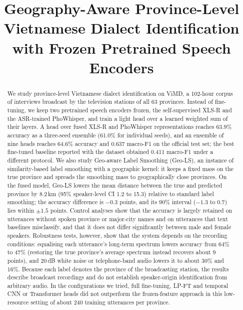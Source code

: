 \documentclass[conference]{IEEEtran}
\begin{document}
\title{Geography-Aware Province-Level Vietnamese Dialect Identification with Frozen Pretrained Speech Encoders}

\author{
}

\maketitle

\begin{abstract}
We study province-level Vietnamese dialect identification on ViMD, a 102-hour corpus of interviews broadcast by the television stations of all 63 provinces. Instead of fine-tuning, we keep two pretrained speech encoders frozen, the self-supervised XLS-R and the ASR-trained PhoWhisper, and train a light head over a learned weighted sum of their layers. A head over fused XLS-R and PhoWhisper representations reaches 63.9\% accuracy as a three-seed ensemble (61.0\% for individual seeds), and an ensemble of nine heads reaches 64.6\% accuracy and 0.637 macro-F1 on the official test set; the best fine-tuned baseline reported with the dataset obtained 0.411 macro-F1 under a different protocol. We also study Geo-aware Label Smoothing (Geo-LS), an instance of similarity-based label smoothing with a geographic kernel: it keeps a fixed mass on the true province and spreads the smoothing mass to geographically close provinces. On the fused model, Geo-LS lowers the mean distance between the true and predicted province by 8.2\,km (95\% speaker-level CI 1.2 to 15.3) relative to standard label smoothing; the accuracy difference is $-0.3$ points, and its 90\% interval ($-1.3$ to 0.7) lies within $\pm 1.5$ points. Control analyses show that the accuracy is largely retained on utterances without spoken province or major-city names and on utterances that text baselines misclassify, and that it does not differ significantly between male and female speakers. Robustness tests, however, show that the system depends on the recording conditions: equalising each utterance's long-term spectrum lowers accuracy from 64\% to 47\% (restoring the true province's average spectrum instead recovers about 9 points), and 20\,dB white noise or telephone-band audio lowers it to about 30\% and 16\%. Because each label denotes the province of the broadcasting station, the results describe broadcast recordings and do not establish speaker-origin identification from arbitrary audio. In the configurations we tried, full fine-tuning, LP-FT and temporal CNN or Transformer heads did not outperform the frozen-feature approach in this low-resource setting of about 240 training utterances per province.
\end{abstract}
\end{document}
